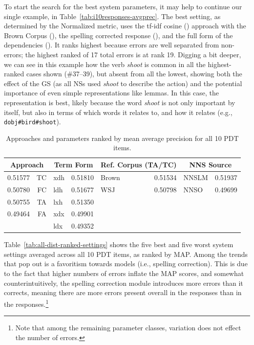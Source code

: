 To start the search for the best system parameters, it may help to
continue our single example, in
Table~\ref{tab:i10responses-avgprec}. The best setting, as determined by the
Normalized metric, uses the tf-idf cosine () approach with the Brown Corpus (),
the spelling corrected response (), and the full form of
the dependencies (). It ranks highest because errors are
well separated from non-errors; the highest ranked of 17 total errors
is at rank 19.  Digging a bit deeper, we can see in this example how
the verb \textit{shoot} is common in all the highest-ranked cases shown
(\#37--39), but absent from all the lowest, showing both the effect of
the GS (as all NSs used \textit{shoot} to describe the action) and the
potential importance of even simple representations like lemmas.  In
this case, the  representation is best, likely because the
word \textit{shoot} is not only important by itself, but also in terms
of which words it relates to, and how it relates (e.g.,
\texttt{dobj\#bird\#shoot}).

\begin{table}
\begin{center}
\begin{tabular}{|l|r||l|r||l|r||l|r|}
\hline
\multicolumn{2}{|c||}{Approach} & \multicolumn{2}{|c||}{Term Form} & \multicolumn{2}{|c||}{Ref. Corpus (TA/TC)} & \multicolumn{2}{|c|}{NNS Source} \\
\hline
\hline
0.51577 & TC & xdh & 0.51810 & Brown & 0.51534 & NNSLM & 0.51937 \\
\hline
0.50780 & FC & ldh & 0.51677 & WSJ & 0.50798 & NNSO & 0.49699 \\
\hline
0.50755 & TA & lxh & 0.51350 & & & & \\
\hline
0.49464 & FA & xdx & 0.49901 & & & & \\
\hline
& 	& ldx & 0.49352 &  &  &  & \\
\hline
\end{tabular}
\caption{Approaches and parameters ranked by mean average precision for all 10 PDT items.}
\label{tab:dist-ranked-parameters}
\end{center}
\end{table}

Table~\ref{tab:all-dist-ranked-settings} shows the five best and five
worst system settings averaged across all 10 PDT items, as ranked by
MAP. Among the trends that pop out is a favoritism
towards  models (i.e., spelling correction). This is due
to the fact that higher numbers of errors inflate the MAP scores, and
somewhat counterintuitively, the spelling correction module introduces
more errors than it corrects, meaning there are more errors present
overall in the  responses than in the 
responses.\footnote{Note that among the remaining parameter classes,
variation does not effect the number of errors.}

